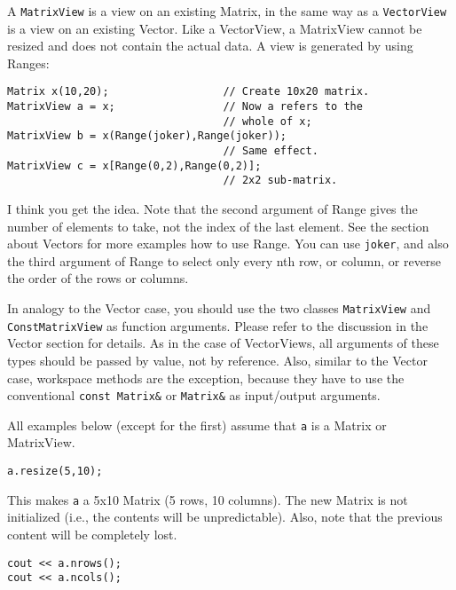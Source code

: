 A \verb|MatrixView| is a view on an existing Matrix, in the same way
as a \verb|VectorView| is a view on an existing Vector. Like a
VectorView, a MatrixView cannot be resized and does not contain the
actual data. A view is generated by using Ranges:

\begin{verbatim}
Matrix x(10,20);                  // Create 10x20 matrix.
MatrixView a = x;                 // Now a refers to the 
                                  // whole of x;
MatrixView b = x(Range(joker),Range(joker));
                                  // Same effect.
MatrixView c = x[Range(0,2),Range(0,2)];
                                  // 2x2 sub-matrix.
\end{verbatim}

I think you get the idea. Note that the second argument of Range gives
the number of elements to take, not the index of the last element. See
the section about Vectors for more examples how to use Range. You can
use \verb|joker|, and also the third argument of Range to select only
every nth row, or column, or reverse the order of the rows or columns. 

In analogy to the Vector case, you should use the two classes
\verb|MatrixView| and \verb|ConstMatrixView| as function arguments.
Please refer to the discussion in the Vector section for details. As
in the case of VectorViews, all arguments of these types should be
passed by value, not by reference. Also, similar to the Vector case,
workspace methods are the exception, because they have to use the
conventional \verb|const Matrix&| or \verb|Matrix&| as input/output
arguments.


All examples below (except for the first) assume that \verb|a| is a
Matrix or MatrixView.

\begin{verbatim}
a.resize(5,10);
\end{verbatim}
This makes \verb|a| a 5x10 Matrix (5 rows, 10 columns). The new Matrix
is not initialized (i.e., the contents will be unpredictable). Also,
note that the previous content will be completely lost.

\begin{verbatim}
cout << a.nrows();
cout << a.ncols();
\end{verbatim}

